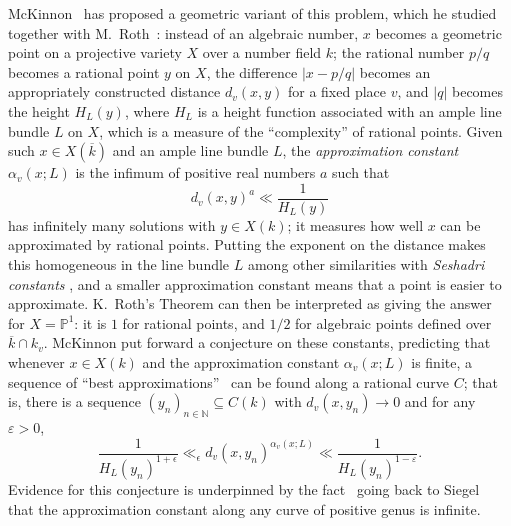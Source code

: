 \documentclass[a4paper, twoside, 11pt]{amsart}
\theoremstyle{definition}
\newcommand{\NN}{\mathbb{N}}
\newcommand{\PP}{\mathbb{P}}
\begin{document}
McKinnon~\cite{McK} has proposed a geometric variant of this problem, which he studied together with M.~Roth~\cite{McK-Roth}:
instead of an algebraic number, $x$ becomes a geometric point on a projective variety $X$ over a number field $k$; the rational number $p/q$ becomes a rational point $y$ on $X$, the difference $|x-p/q|$ becomes an appropriately constructed distance $d_v(x,y)$ for a fixed place $v$, and $|q|$ becomes the height $H_L(y)$, where $H_L$ is a height function associated with an ample line bundle $L$ on $X$, which is a measure of the ``complexity'' of rational points. Given such $x\in X(\overline{k})$ and an ample line bundle $L$, the \emph{approximation constant} $\alpha_v(x;L)$ is the infimum of positive real numbers $a$ such that
\begin{equation*}
	d_v(x,y)^a \ll \frac{1}{H_L(y)}
\end{equation*}
has infinitely many solutions with $y\in X(k)$; it measures how well $x$ can be approximated by rational points. Putting the exponent on the distance makes this homogeneous in the line bundle $L$ among other similarities with \emph{Seshadri constants} \cite[\S3]{McK-Roth}, and a smaller approximation constant means that a point is easier to approximate.
K.~Roth's Theorem can then be interpreted as giving the answer for $X=\PP^1$: it is $1$ for rational points, and $1/2$ for algebraic points defined over $\overline{k}\cap k_v$.
McKinnon put forward a conjecture \cite[Conj.~2.7]{McK} on these constants, predicting that whenever $x\in X(k)$ and the approximation constant $\alpha_v(x;L)$ is finite,
a sequence of ``best approximations''~\cite[Def.~2.5]{McK} can be found along a rational curve $C$;
that is, there is a sequence $(y_n)_{n\in \NN}\subseteq C(k)$ with $d_v(x,y_n)\to 0$ and for any $\varepsilon>0$,
\begin{equation*}
	\frac{1}{H_L(y_n)^{1+\epsilon}} \ll_\epsilon d_v(x,y_n)^{\alpha_v(x;L)} \ll \frac{1}{H_L(y_n)^{1-\varepsilon}}.
\end{equation*}
Evidence for this conjecture is underpinned by the fact~\cite[\S\,7.3~2nd Thm, \S\,7.4]{serre-mordell} going back to Siegel~\cite{Siegel} that the approximation constant along any curve of positive genus is infinite.
\end{document}
